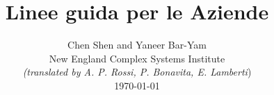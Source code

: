 \documentclass[onecolumn,journal]{IEEEtran}
\begin{document}
\title{\color{Brown}  Linee guida per le Aziende
\vspace{-0.35ex}}
\author{Chen Shen and Yaneer Bar-Yam \\ New England Complex Systems Institute \\
\vspace{+0.35ex}
\small{\textit{(translated by A. P. Rossi, P. Bonavita, E. Lamberti})}\\
 \today
  \vspace{-8ex} \\
\textbf{}
 }

\maketitle




\thispagestyle{empty} %




\end{document}
